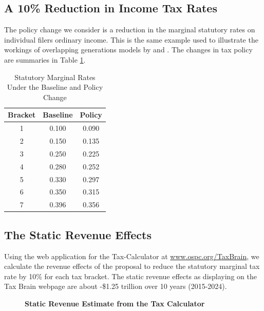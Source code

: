 \documentclass[letterpaper,12pt]{article}
\theoremstyle{definition}
\begin{document}
\begin{spacing}{1.5}
\section{A 10\% Reduction in Income Tax Rates}\label{SecResults}

  The policy change we consider is a reduction in the marginal statutory rates on individual filers ordinary income.  This is the same example used to illustrate the workings of overlapping generations models by \citet{CBO2004} and \citet{DM2011}.  The changes in tax policy are summaries in Table \ref{tab:rates}.


  \begin{table}[htbp]
    \centering
    \caption{Statutory Marginal Rates Under the Baseline and Policy Change}
      \begin{tabular}{ccc}
      \hline
      \hline
      Bracket & Baseline & Policy \\
      \hline
      1     & 0.100 & 0.090 \\
      2     & 0.150 & 0.135 \\
      3     & 0.250 & 0.225 \\
      4     & 0.280 & 0.252 \\
      5     & 0.330 & 0.297 \\
      6     & 0.350 & 0.315 \\
      7     & 0.396 & 0.356 \\
      \hline
      \hline
      \end{tabular}%
    \label{tab:rates}%
  \end{table}%


  \subsection{The Static Revenue Effects}

    Using the web application for the Tax-Calculator at \href{www.ospc.org/TaxBrain}{www.ospc.org/TaxBrain}, we calculate the revenue effects of the proposal to reduce the statutory marginal tax rate by 10\% for each tax bracket.  The static revenue effects as displaying on the Tax Brain webpage are about -\$1.25 trillion over 10 years (2015-2024).


    \begin{figure}[htbp]\centering \captionsetup{width=5.0in}
      \caption{\label{TaxBrainScore}\textbf{Static Revenue Estimate from the Tax Calculator}}
    \end{figure}


\end{spacing}
\end{document}

